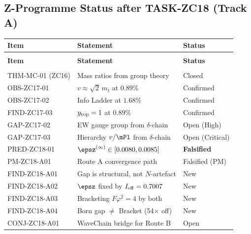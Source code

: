 \documentclass[12pt, a4paper]{article}
\begin{document}
\subsection{Z-Programme Status after TASK-ZC18 (Track A)}
\label{zc18a:sec:status}

\begin{derivedbox}[title={Z-Programme Status after ZC18 Track~A}]
{\small
\setlength{\LTpre}{4pt}
\setlength{\LTpost}{4pt}
\renewcommand{\arraystretch}{1.30}
\begin{longtable}{>{\raggedright\arraybackslash}p{3.8cm}
                  >{\raggedright\arraybackslash}p{6.2cm}
                  >{\centering\arraybackslash}p{2.0cm}}
\toprule
\textbf{Item} & \textbf{Statement} & \textbf{Status} \\
\midrule
\endfirsthead
\multicolumn{3}{l}{\small\textit{(continued)}}\\[4pt]
\toprule
\textbf{Item} & \textbf{Statement} & \textbf{Status} \\
\midrule
\endhead
\midrule
\multicolumn{3}{r}{\small\textit{(continues)}}\\
\endfoot
\bottomrule
\endlastfoot
THM-MC-01 (ZC16)   & Mass ratios from group theory & Closed \\
OBS-ZC17-01        & $v\approx\sqrt{2}\,m_t$ at $0.89\%$ & Confirmed \\
OBS-ZC17-02        & Info Ladder at $1.68\%$ & Confirmed \\
FIND-ZC17-03       & $y_{\rm top}=1$ at $0.89\%$ & Confirmed \\
\midrule
GAP-ZC17-02        & EW gauge group from $\delta$-chain & Open (High) \\
GAP-ZC17-03        & Hierarchy $v/\mPl$ from $\delta$-chain & Open (Critical) \\
\midrule
PRED-ZC18-01       & $\epsz^{(\infty)}\in[0.0080,0.0085]$ & \textbf{Falsified} \\
PM-ZC18-A01        & Route A convergence path & Falsified (PM) \\
\midrule
FIND-ZC18-A01      & Gap is structural, not $N$-artefact & New \\
FIND-ZC18-A02      & $\epsz$ fixed by $I_{\rm eff}=0.7007$ & New \\
FIND-ZC18-A03      & Bracketing $F\varphi^2=4$ by both & New \\
FIND-ZC18-A04      & Born gap $\neq$ Bracket (54$\times$ off) & New \\
CONJ-ZC18-A01      & WaveChain bridge for Route B & Open \\
\end{longtable}
}
\end{derivedbox}
\end{document}
